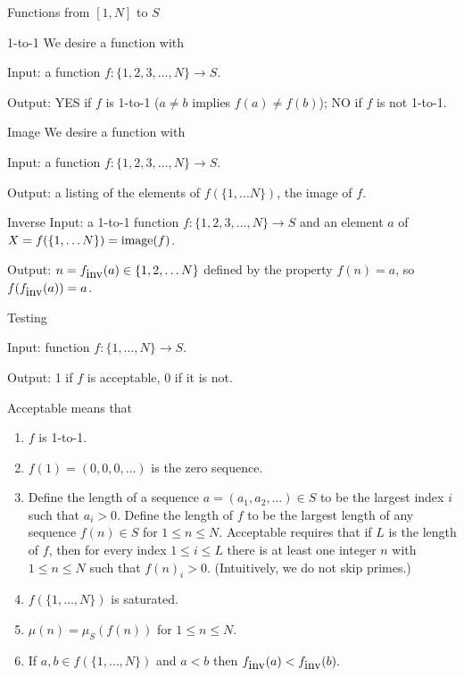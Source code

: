 \documentclass{article}
\begin{document}
\begin{section}{Functions from $[1, N]$ to $S$}
\begin{subsubsection}{1-to-1}
We desire a function with 

Input:  a function $f:\{1, 2, 3, \ldots, N\} \rightarrow S$.

Output: YES if $f$  is 1-to-1 ($a\ne b$ implies $f(a)\ne f(b)$); NO if $f$ is not 1-to-1. 
\end{subsubsection}


\begin{subsubsection}{Image}
We desire a function with 

Input: a  function $f:\{1, 2, 3, \ldots, N\} \rightarrow S$. 

Output: a listing of the elements of $f(\{1, \ldots N\} )$, the image of $f$.  




\end{subsubsection}


\begin{subsubsection}{Inverse}
Input: a 1-to-1 function $f:\{1, 2, 3, \ldots, N\} \rightarrow S$ and an element $a$ of $X=f(\{1, \ldots N\} )= \hbox{image}(f)$.

Output:  $n= f_{\hbox{inv}}(a) \in \{1, 2, \ldots N\}$ defined by the property $f(n)=a$, so $f(f_{\hbox{inv}}(a))=a$. 

\end{subsubsection}

\begin{subsubsection}{Testing}

Input:  function $f: \{1, \ldots, N\} \rightarrow S$.

Output:  1 if $f$ is  acceptable, 0 if it is not. 

Acceptable means that 
\begin{enumerate}
\item $f$ is 1-to-1.
\item $f(1)= (0, 0, 0, \ldots)$ is the zero sequence.
\item Define the length of a sequence $a= (a_1, a_2, \ldots)\in S$ to be the largest index $i$ such that $a_i>0$.  Define the length of $f$ to be the largest length of any sequence $f(n)\in S$ for $1\le n \le N$.  Acceptable requires that if $L$ is the length of $f$, then for every index $1\le i \le L$  there is at least one integer $n$ with $1\le n \le N$ such that 
$f(n)_i >0$. (Intuitively, we do not skip primes.)
\item $f(\{1, \ldots, N\})$ is saturated.
\item $\mu(n) =\mu_S (f(n))$ for $1\le n \le N$. 
\item If $a, b \in f(\{1, \ldots, N\})$ and $a<b$ then $f_{\hbox{inv} }(a) < f_{\hbox{inv} }(b).$
\end{enumerate}


\end{subsubsection}
\end{section}
\end{document}
